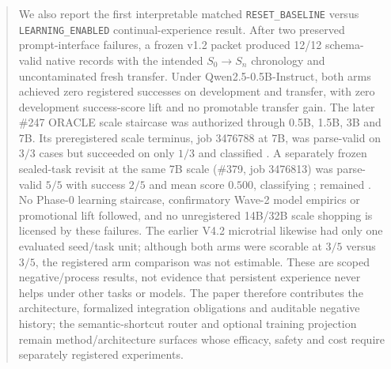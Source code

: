 \documentclass[11pt]{article}
\begin{document}
\begin{abstract}
We also report the first interpretable matched \texttt{RESET\_BASELINE} versus \texttt{LEARNING\_ENABLED} continual-experience result. After two preserved prompt-interface failures, a frozen v1.2 packet produced 12/12 schema-valid native records with the intended $S_0\rightarrow S_n$ chronology and uncontaminated fresh transfer. Under Qwen2.5-0.5B-Instruct, both arms achieved zero registered successes on development and transfer, with zero development success-score lift and no promotable transfer gain. The later \#247 ORACLE scale staircase was authorized through 0.5B, 1.5B, 3B and 7B. Its preregistered scale terminus, job 3476788 at 7B, was parse-valid on $3/3$ cases but succeeded on only $1/3$ and classified . A separately frozen sealed-task revisit at the same 7B scale (\#379, job 3476813) was parse-valid $5/5$ with success $2/5$ and mean score $0.500$, classifying ;  remained . No Phase-0 learning staircase, confirmatory Wave-2 model empirics or promotional lift followed, and no unregistered 14B/32B scale shopping is licensed by these failures. The earlier V4.2 microtrial likewise had only one evaluated seed/task unit; although both arms were scorable at $3/5$ versus $3/5$, the registered arm comparison was not estimable. These are scoped negative/process results, not evidence that persistent experience never helps under other tasks or models. The paper therefore contributes the architecture, formalized integration obligations and auditable negative history; the semantic-shortcut router and optional training projection remain method/architecture surfaces whose efficacy, safety and cost require separately registered experiments.
\end{abstract}



























\end{document}
